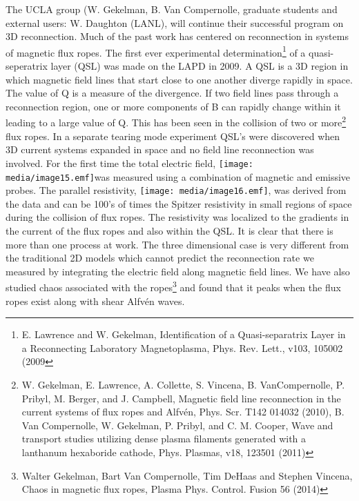 \documentclass[11pt]{article}
\begin{document}
\begin{description}
The UCLA group (W. Gekelman, B. Van Compernolle, graduate students and
external users: W. Daughton (LANL), will continue their successful
program on 3D reconnection. Much of the past work has centered on
reconnection in systems of magnetic flux ropes. The first ever
experimental determination\footnote{E. Lawrence and W. Gekelman,
  Identification of a Quasi-separatrix Layer in a Reconnecting
  Laboratory Magnetoplasma, Phys. Rev. Lett., v103, 105002 (2009} of a
quasi-seperatrix layer (QSL) was made on the LAPD in 2009. A QSL is a 3D
region in which magnetic field lines that start close to one another
diverge rapidly in space. The value of Q is a measure of the divergence.
If two field lines pass through a reconnection region, one or more
components of B can rapidly change within it leading to a large value of
Q. This has been seen in the collision of two or more\footnote{W.
  Gekelman, E. Lawrence, A. Collette, S. Vincena, B. VanCompernolle, P.
  Pribyl, M. Berger, and J. Campbell, Magnetic field line reconnection
  in the current systems of flux ropes and Alfvén, Phys. Scr. T142
  014032 (2010), B. Van Compernolle, W. Gekelman, P. Pribyl, and C. M.
  Cooper, Wave and transport studies utilizing dense plasma filaments
  generated with a lanthanum hexaboride cathode, Phys. Plasmas, v18,
  123501 (2011)} flux ropes. In a separate tearing mode experiment QSL's
were discovered when 3D current systems expanded in space and no field
line reconnection was involved. For the first time the total electric
field, \texttt{[image: media/image15.emf]}was measured using a
combination of magnetic and emissive probes. The parallel resistivity,
\texttt{[image: media/image16.emf]}, was derived from the data and can
be 100's of times the Spitzer resistivity in small regions of space
during the collision of flux ropes. The resistivity was localized to the
gradients in the current of the flux ropes and also within the QSL. It
is clear that there is more than one process at work. The three
dimensional case is very different from the traditional 2D models which
cannot predict the reconnection rate we measured by integrating the
electric field along magnetic field lines. We have also studied chaos
associated with the ropes\footnote{Walter Gekelman, Bart Van
  Compernolle, Tim DeHaas and Stephen Vincena, Chaos in magnetic flux
  ropes, Plasma Phys. Control. Fusion 56 (2014)} and found that it peaks
when the flux ropes exist along with shear Alfvén waves.


\end{description}
\end{document}
